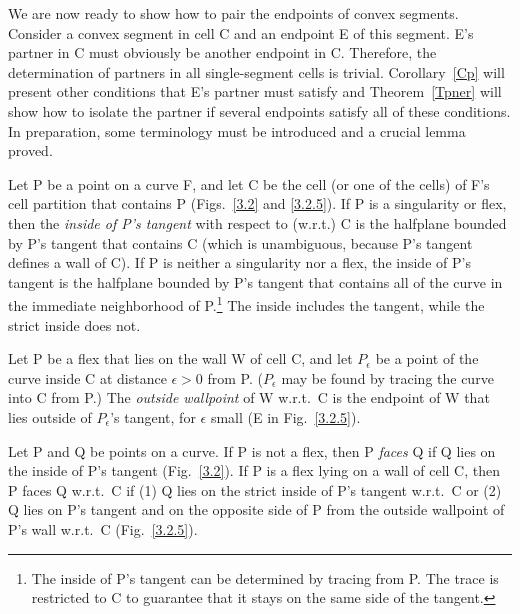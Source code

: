 We are now ready to show how to pair the endpoints of convex segments.
Consider a convex segment in cell C and an endpoint E of this segment.
E's partner in C must obviously be another endpoint in C.
Therefore, the determination of partners in all single-segment cells is trivial.
Corollary~\ref{Cp} will present other conditions that E's partner must satisfy
and Theorem~\ref{Tpner} will show how to isolate the partner if several endpoints
satisfy all of these conditions.
In preparation, some terminology must be introduced and a crucial lemma proved.
%
%
\begin{definition}
Let P be a point on a curve F, and let C be the cell (or one
of the cells) of F's cell partition that contains P 
(Figs.~\ref{3.2} and \ref{3.2.5}).
If P is a singularity or flex, then the 
{\em inside of P's tangent} with respect to (w.r.t.) C is the 
halfplane bounded by P's tangent that contains C (which is unambiguous, because P's 
tangent defines a wall of C).  
If P is neither a singularity nor a flex, 
the inside of P's tangent is the halfplane bounded by P's tangent that 
contains all of the curve in the immediate neighborhood of P.\footnote{The 
	inside of P's tangent
	can be determined by tracing from P.
	The trace is restricted to C
	to guarantee that it stays on the same side of the tangent.}
The inside includes the tangent, while the strict inside does not.

Let P be a flex that lies on the wall W of cell C, and 
let $P_{\epsilon}$ be a point of the curve inside C at distance
$\epsilon > 0$ from P.
($P_{\epsilon}$ may be found by tracing the curve into C from P.)
The {\em outside wallpoint} of W w.r.t.\ C is the endpoint of W that 
lies outside of $P_{\epsilon}$'s tangent, for $\epsilon$ small (E in Fig.~\ref{3.2.5}).

Let P and Q be points on a curve.
If P is not a flex, then P {\em faces} Q if Q lies on the inside of 
P's tangent (Fig.~\ref{3.2}).
If P is a flex lying on a wall of cell C, then
P faces Q w.r.t.\ C if (1) Q lies on the strict inside of P's tangent 
w.r.t.\ C or (2) Q lies on P's tangent and on the opposite side of P from 
the outside wallpoint of P's wall w.r.t.\ C (Fig.~\ref{3.2.5}).
\end{definition}


